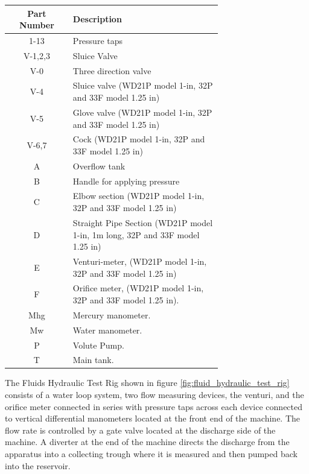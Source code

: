\begin{table}[ht]
  \begin{center}
    \leavevmode
     \begin{tabular}{|c | p{0.7\linewidth}|}\hline
     Part Number & Description \\ \hline
      1-13 & Pressure taps \\
      \hline
      V-1,2,3 & Sluice Valve \\
      \hline
      V-0 & Three direction valve \\
      \hline
      V-4 & Sluice valve (\ac{WD}21\ac{P} model 1-in, 32P and 33F model 1.25 in) \\
      \hline
      V-5 & Glove valve (WD21P model 1-in, 32P and 33F model 1.25 in) \\
      \hline
      V-6,7 & Cock (WD21P model 1-in, 32P and 33F model 1.25 in) \\ 
      \hline
      A & Overflow tank \\ 
      \hline
      B & Handle for applying pressure \\ 
      \hline
      C & Elbow section (WD21P model 1-in, 32P and 33F model 1.25 in) \\ 
      \hline
      D & Straight Pipe Section (WD21P model 1-in, 1m long, 32P and 33F model 1.25 in) \\ 
      \hline
      E & Venturi-meter, (WD21P model 1-in, 32P and 33F model 1.25 in) \\ 
      \hline
      F & Orifice meter, (WD21P model 1-in, 32P and 33F model 1.25 in). \\ 
      \hline
      Mhg & Mercury manometer. \\ 
      \hline
      Mw & Water manometer. \\ 
      \hline
      P & Volute Pump. \\ 
      \hline
      T & Main tank. \\ 
      \hline
    \end{tabular}
    \label{table:1}
  \end{center}
\end{table}

The Fluids Hydraulic Test Rig shown in figure \ref{fig:fluid_hydraulic_test_rig} consists of a water loop system, two flow measuring devices, the venturi, and the orifice meter connected in series with pressure taps across each device connected to vertical differential manometers located at the front end of the machine. The flow rate is controlled by a gate valve located at the discharge side of the machine. A diverter at the end of the machine directs the discharge from the apparatus into a collecting trough where it is measured and then pumped back into the reservoir.   

